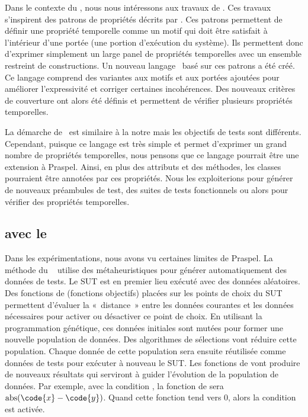 Dans le contexte du , nous nous intéressons
aux travaux de . Ces travaux s'inspirent des patrons de
propriétés décrits par . Ces patrons permettent de définir une
propriété temporelle comme un motif qui doit être satisfait à l'intérieur d'une
portée (une portion d'exécution du système).  Ils permettent donc d'exprimer
simplement un large panel de propriétés temporelles avec un ensemble restreint
de constructions. Un nouveau langage~ basé sur ces
patrons a été créé. Ce langage comprend des variantes aux motifs et aux portées
ajoutées pour améliorer l'expressivité et corriger certaines incohérences. Des
nouveaux critères de couverture ont alors été définis et permettent de vérifier
plusieurs propriétés temporelles.

La démarche de~ est similaire à la notre mais les objectifs
de tests sont différents. Cependant, puisque ce langage est très simple et
permet d'exprimer un grand nombre de propriétés temporelles, nous pensons que ce
langage pourrait être une extension à Praspel. Ainsi, en plus des attributs et
des méthodes, les classes pourraient être annotées par ces propriétés. Nous les
exploiterions pour générer de nouveaux préambules de test, des suites de tests
fonctionnels ou alors pour vérifier des propriétés temporelles.

\subsection{ avec le }

Dans les expérimentations, nous avons vu certaines limites de Praspel. La
méthode du ~ utilise des
métaheuristiques pour générer automatiquement des données de tests. Le SUT est
en premier lieu exécuté avec des données aléatoires. Des fonctions de
 (fonctions objectifs) placées sur les points de choix du SUT
permettent d'évaluer la «~distance~» entre les données courantes et les données
nécessaires pour activer ou désactiver ce point de choix. En utilisant la
programmation génétique, ces données initiales sont mutées pour former une
nouvelle population de données. Des algorithmes de sélections vont réduire cette
population. Chaque donnée de cette population sera ensuite réutilisée comme
données de tests pour exécuter à nouveau le SUT. Les fonctions de
 vont produire de nouveaux résultats qui serviront à guider
l'évolution de la population de données. Par exemple, avec la condition , la fonction de  sera $\mathrm{abs}(\code{x} -
\code{y})$. Quand cette fonction tend vers 0, alors la condition est activée.

